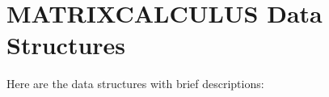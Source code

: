 \section{MATRIXCALCULUS Data Structures}
Here are the data structures with brief descriptions:\begin{CompactList}
\item{}
\item{}
\end{CompactList}
